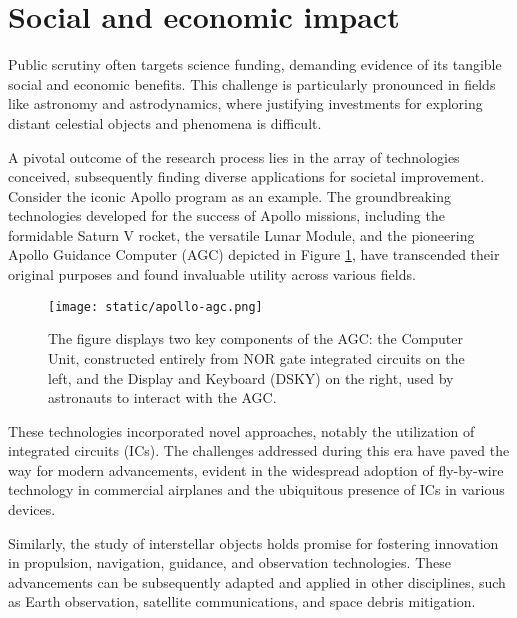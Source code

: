 \section{Social and economic impact}

Public scrutiny often targets science funding, demanding evidence of its
tangible social and economic benefits. This challenge is particularly pronounced
in fields like astronomy and astrodynamics, where justifying investments for
exploring distant celestial objects and phenomena is difficult.

A pivotal outcome of the research process lies in the array of technologies
conceived, subsequently finding diverse applications for societal improvement.
Consider the iconic Apollo program as an example. The groundbreaking
technologies developed for the success of Apollo missions, including the
formidable Saturn V rocket, the versatile Lunar Module, and the pioneering
Apollo Guidance Computer (AGC) depicted in Figure \ref{fig:apollo-agc}, have
transcended their original purposes and found invaluable utility across various
fields.

\begin{figure}[H]
  \centering
  \texttt{[image: static/apollo-agc.png]}
  \caption[Apollo Guidance Computer]{
    The figure displays two key components of the AGC: the Computer Unit,
    constructed entirely from NOR gate integrated circuits on the left, and
    the Display and Keyboard (DSKY) on the right, used by astronauts to
    interact with the AGC.
  }
  \label{fig:apollo-agc}
\end{figure}

These technologies incorporated novel approaches, notably the utilization of
integrated circuits (ICs). The challenges addressed during this era have paved
the way for modern advancements, evident in the widespread adoption of
fly-by-wire technology in commercial airplanes and the ubiquitous presence of
ICs in various devices.

Similarly, the study of interstellar objects holds promise for fostering
innovation in propulsion, navigation, guidance, and observation technologies. These
advancements can be subsequently adapted and applied in other disciplines, such
as Earth observation, satellite communications, and space debris mitigation.
